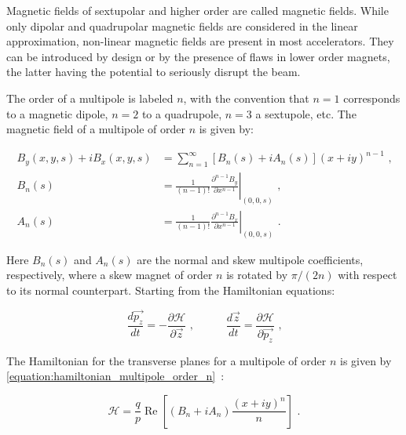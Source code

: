 Magnetic fields of sextupolar and higher order are called  magnetic fields.
While only dipolar and quadrupolar magnetic fields are considered in the linear approximation, non-linear magnetic fields are present in most accelerators.
They can be introduced by design or by the presence of flaws in lower order magnets, the latter having the potential to seriously disrupt the beam.

The order of a multipole is labeled \(n\), with the convention that \(n = 1\) corresponds to a magnetic dipole, \(n = 2\) to a quadrupole, \(n = 3\) a sextupole, etc.
The magnetic field of a multipole of order \(n\) is given by:

\begin{equation}
    \begin{aligned}
    B_y(x, y, s) + i B_x(x, y, s) & = \sum_{n=1}^{\infty} \left[ B_n(s) + i A_n(s) \right] (x + i y)^{n-1} \text{ ,} \\
    B_n(s)                        & = \left. \frac{1}{(n - 1) !} \frac{\partial^{n - 1} B_y}{\partial x^{n - 1}} \right|_{(0,0,s)} \text{ ,} \\
    A_n(s)                        & = \left. \frac{1}{(n - 1) !} \frac{\partial^{n - 1} B_x}{\partial x^{n - 1}} \right|_{(0,0,s)} \text{ .} 
    \end{aligned}
    \label{equation:multipole_expansion}
\end{equation}

Here \(B_n(s)\) and \(A_n(s)\) are the normal and skew multipole coefficients, respectively, where a skew magnet of order \(n\) is rotated by \(\pi / (2 n)\) with respect to its normal counterpart.
Starting from the Hamiltonian equations:

\begin{equation}
    \dfrac{d \vec{p_z}}{d t} = - \frac{\partial \mathcal{H}}{\partial \vec{z}} \text{ ,} \quad \quad \quad \dfrac{d \vec{z}}{d t} = \frac{\partial \mathcal{H}}{\partial \vec{p_z}} \text{ ,}
    \label{equation:hamiltonian_equations}
\end{equation}

The Hamiltonian for the transverse planes for a multipole of order \(n\) is given by \cref{equation:hamiltonian_multipole_order_n}~\cite{PHD:Tomas, PHD:Franchi}:

\begin{equation}
    \mathcal{H} = \frac{q}{p} \operatorname{Re} \left[ \left( B_n +i A_n \right) \frac{(x + i y)^n}{n} \right] \text{ .}
    \label{equation:hamiltonian_multipole_order_n}
\end{equation}

